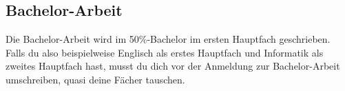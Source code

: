 \subsection{Bachelor-Arbeit}
Die Bachelor-Arbeit wird im 50\%-Bachelor im ersten Hauptfach geschrieben. Falls du also beispielweise Englisch als erstes Hauptfach und Informatik als zweites Hauptfach hast, musst du dich vor der Anmeldung zur Bachelor-Arbeit umschreiben, quasi deine Fächer tauschen. 
